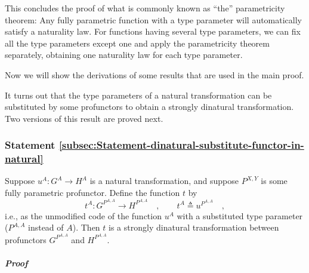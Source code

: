 This concludes the proof of what is commonly known as \textsf{``}the\textsf{''} parametricity
theorem: Any fully parametric function with a type parameter will
automatically satisfy a naturality law. For functions having several
type parameters, we can fix all the type parameters except one and
apply the parametricity theorem separately, obtaining one naturality
law for each type parameter.

Now we will show the derivations of some results that are used in
the main proof. 

It turns out that the type parameters of a natural transformation
can be substituted by some profunctors to obtain a strongly dinatural
transformation. Two versions of this result are proved next.

\subsubsection{Statement \label{subsec:Statement-dinatural-substitute-functor-in-natural}\ref{subsec:Statement-dinatural-substitute-functor-in-natural}}

Suppose $u^{A}:G^{A}\rightarrow H^{A}$ is a natural transformation,
and suppose $P^{X,Y}$ is some fully parametric profunctor. Define
the function $t$ by
\[
t^{A}:G^{P^{A,A}}\rightarrow H^{P^{A,A}}\quad,\quad\quad t^{A}\triangleq u^{P^{A,A}}\quad,
\]
i.e., as the unmodified code of the function $u^{A}$ with a substituted
type parameter ($P^{A,A}$ instead of $A$). Then $t$ is a strongly
dinatural transformation between profunctors $G^{P^{A,A}}$ and $H^{P^{A,A}}$.

\subparagraph{Proof}

